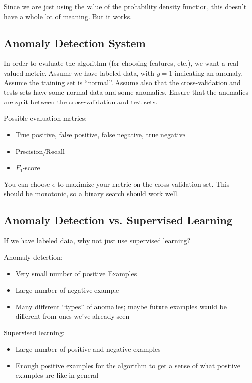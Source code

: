 Since we are just using the value of the probability density function,
this doesn't have a whole lot of meaning.
But it works.

\subsection{Anomaly Detection System}

In order to evaluate the algorithm (for choosing features, etc.),
we want a real-valued metric.
Assume we have labeled data, with $y=1$ indicating an anomaly.
Assume the training set is ``normal''.
Assume also that the cross-validation and tests sets have some normal data and some anomalies.
Ensure that the anomalies are split between the cross-validation and test sets.

Possible evaluation metrics:
\begin{itemize}
    \item True positive, false positive, false negative, true negative
    \item Precision/Recall
    \item $F_1$-score
\end{itemize}

You can choose $\epsilon$ to maximize your metric on the cross-validation set.
This should be monotonic, so a binary search should work well.

\subsection{Anomaly Detection vs. Supervised Learning}

If we have labeled data, why not just use supervised learning?

Anomaly detection:
\begin{itemize}
    \item Very small number of positive Examples
    \item Large number of negative example
    \item Many different ``types'' of anomalies; maybe future examples
        would be different from ones we've already seen
\end{itemize}

Supervised learning:
\begin{itemize}
    \item Large number of positive and negative examples
    \item Enough positive examples for the algorithm to get a sense of what
        positive examples are like in general
\end{itemize}

